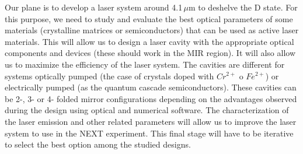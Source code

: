 \begin{itemize}
Our plane is to develop a laser system around 4.1\,$\mu$m to deshelve the D state. For this purpose, we need to study and evaluate the best optical parameters of some materials (crystalline matrices or semiconductors) that can be used as active laser materials.  This will allow us to design a laser cavity with the appropriate  optical components and devices (these should work in the MIR region). It will also allow us to maximize the efficiency of the laser system. The cavities are different for systems optically pumped (the case of crystals doped with $Cr^{2+}$ o $Fe^{2+}$) or electrically pumped (as the quantum cascade semiconductors). These cavities can be 2-, 3- or 4- folded mirror configurations depending on the advantages observed during the design using optical and numerical software. The characterization of the laser emission and other related parameters will allow us  to improve the laser system to use in the NEXT experiment. This final stage will have to be iterative to select the best option among the studied designs. 

\end{itemize}



